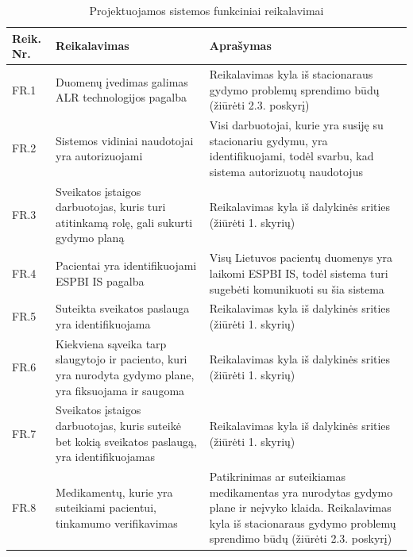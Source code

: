 \begin{table}[!ht]
    \centering
    \renewcommand{\arraystretch}{1.2}
    \renewcommand\thetable{5}

    \begin{tabular}{|m{3em}|m{17em}|m{17em}|}
    \hline 
    \rowcolor[HTML]{EFEFEF} 
    Reik. Nr. & Reikalavimas & Aprašymas \\ \hline
    FR.1  &  Duomenų įvedimas galimas ALR technologijos pagalba  & Reikalavimas kyla iš stacionaraus gydymo problemų sprendimo būdų  (žiūrėti 2.3. poskyrį)    \\ \hline
    FR.2  &  Sistemos vidiniai naudotojai yra autorizuojami  &  Visi darbuotojai, kurie yra susiję su stacionariu gydymu,  yra identifikuojami, todėl svarbu, kad sistema autorizuotų naudotojus       \\ \hline
    FR.3  &  Sveikatos įstaigos darbuotojas, kuris turi atitinkamą rolę, gali sukurti gydymo planą  &   Reikalavimas kyla iš dalykinės srities (žiūrėti 1. skyrių)       \\ \hline
    FR.4  &  Pacientai yra identifikuojami ESPBI IS pagalba  &  Visų Lietuvos pacientų duomenys yra laikomi ESPBI IS, todėl sistema turi sugebėti komunikuoti su šia sistema      \\ \hline
    FR.5  &  Suteikta sveikatos paslauga yra identifikuojama  &   Reikalavimas kyla iš dalykinės srities (žiūrėti 1. skyrių)      \\ \hline
    FR.6  &  Kiekviena sąveika tarp slaugytojo ir paciento, kuri yra nurodyta gydymo plane, yra fiksuojama ir saugoma  &   Reikalavimas kyla iš dalykinės srities (žiūrėti 1. skyrių)       \\ \hline
    FR.7  &  Sveikatos įstaigos darbuotojas, kuris suteikė bet kokią sveikatos paslaugą, yra identifikuojamas  &   Reikalavimas kyla iš dalykinės srities (žiūrėti 1. skyrių)        \\ \hline
    FR.8  &  Medikamentų, kurie yra suteikiami pacientui, tinkamumo verifikavimas   &  Patikrinimas ar suteikiamas medikamentas yra nurodytas gydymo plane ir neįvyko klaida. Reikalavimas kyla iš stacionaraus gydymo problemų sprendimo būdų  (žiūrėti 2.3. poskyrį)       \\ \hline
    \end{tabular}
    \caption{Projektuojamos sistemos funkciniai reikalavimai} 
\end{table}

